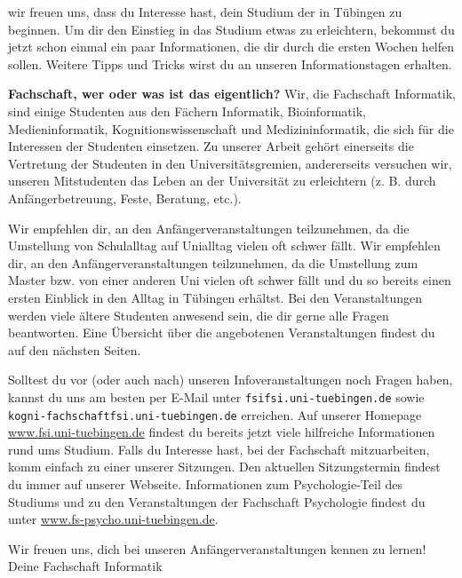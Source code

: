 wir freuen uns, dass du Interesse hast, dein Studium der \studiengang in Tübingen zu beginnen.
Um dir den Einstieg in das Studium etwas zu erleichtern, bekommst du jetzt schon einmal
ein paar Informationen, die dir durch die ersten Wochen helfen sollen.
Weitere Tipps und Tricks wirst du an unseren Informationstagen %
erhalten.

\textbf{\glqq Fachschaft\grqq, wer oder was ist das eigentlich?} Wir, die Fachschaft Informatik, sind einige Studenten aus den Fächern
Informatik, Bioinformatik, Medieninformatik, Kognitionswissenschaft und Medizin\-informatik, die sich für die Interessen der Studenten einsetzen. Zu unserer Arbeit
gehört einerseits die Vertretung der Studenten in den Universitätsgremien, andererseits versuchen wir, unseren
Mitstudenten das Leben an der Universität zu erleichtern (z. B. durch Anfängerbetreuung, Feste,
Beratung, etc.).

\ifbachelor 
Wir empfehlen dir, an den Anfängerveranstaltungen teilzunehmen, da die Umstellung von Schulalltag
auf Unialltag vielen oft schwer fällt. 
\fi
\ifmaster
Wir empfehlen dir, an den Anfängerveranstaltungen teilzunehmen, da die Umstellung zum Master bzw. von einer anderen Uni vielen oft schwer fällt und du so bereits einen ersten Einblick in den Alltag in Tübingen erhältst.
\fi 
Bei den Veranstaltungen werden viele ältere Studenten
anwesend sein, die dir gerne alle Fragen beantworten. Eine Übersicht über die angebotenen
Veranstaltungen findest du auf den nächsten Seiten.

Solltest du vor (oder auch nach) unseren Infoveranstaltungen noch Fragen haben, kannst du uns
am besten per E-Mail unter \texttt{fsi\At fsi.uni-tuebingen.de} 
\ifkogwiss
sowie \texttt{kogni-fachschaft\At fsi.uni-tuebingen.de}
\fi
erreichen. Auf unserer Homepage
\url{www.fsi.uni-tuebingen.de} findest du bereits jetzt viele hilfreiche Informationen rund
ums Studium. Falls du Interesse hast, bei der Fachschaft mitzuarbeiten, komm einfach zu einer unserer Sitzungen. Den aktuellen Sitzungstermin findest du immer auf unserer Webseite.
\ifkogwiss  Informationen zum Psychologie-Teil des Studiums und zu den Veranstaltungen der
Fachschaft Psychologie findest du unter \url{www.fs-psycho.uni-tuebingen.de}.\fi

Wir freuen uns, dich bei unseren Anfängerveranstaltungen kennen zu lernen!\\
Deine Fachschaft Informatik
\vfill

